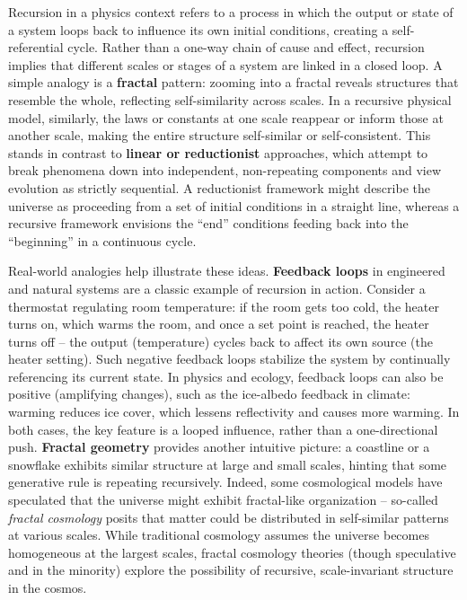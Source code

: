 \documentclass[]{article}
\begin{document}
{Recursion in a physics context refers to a process in which the output
or state of a system loops back to influence its own initial conditions,
creating a self-referential cycle. Rather than a one-way chain of cause
and effect, recursion implies that different scales or stages of a
system are linked in a closed loop. A simple analogy is a
\textbf{fractal} pattern: zooming into a fractal reveals structures that
resemble the whole, reflecting self-similarity across scales​. In a
recursive physical model, similarly, the laws or constants at one scale
reappear or inform those at another scale, making the entire structure
self-similar or self-consistent. This stands in contrast to
\textbf{linear or reductionist} approaches, which attempt to break
phenomena down into independent, non-repeating components and view
evolution as strictly sequential. A reductionist framework might
describe the universe as proceeding from a set of initial conditions in
a straight line, whereas a recursive framework envisions the ``end''
conditions feeding back into the ``beginning'' in a continuous cycle.

Real-world analogies help illustrate these ideas. \textbf{Feedback
loops} in engineered and natural systems are a classic example of
recursion in action. Consider a thermostat regulating room temperature:
if the room gets too cold, the heater turns on, which warms the room,
and once a set point is reached, the heater turns off -- the output
(temperature) cycles back to affect its own source (the heater setting).
Such negative feedback loops stabilize the system by continually
referencing its current state. In physics and ecology, feedback loops
can also be positive (amplifying changes), such as the ice-albedo
feedback in climate: warming reduces ice cover, which lessens
reflectivity and causes more warming. In both cases, the key feature is
a looped influence, rather than a one-directional push. \textbf{Fractal
geometry} provides another intuitive picture: a coastline or a snowflake
exhibits similar structure at large and small scales, hinting that some
generative rule is repeating recursively. Indeed, some cosmological
models have speculated that the universe might exhibit fractal-like
organization -- so-called \emph{fractal cosmology} posits that matter
could be distributed in self-similar patterns at various scales​. While
traditional cosmology assumes the universe becomes homogeneous at the
largest scales, fractal cosmology theories (though speculative and in
the minority) explore the possibility of recursive, scale-invariant
structure in the cosmos​.

}
\end{document}

